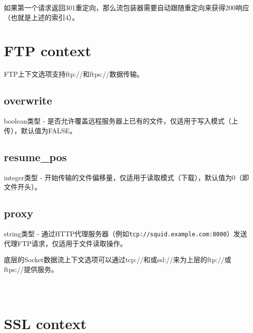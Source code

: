 如果第一个请求返回301重定向，那么流包装器需要自动跟随重定向来获得200响应（也就是上述的索引4）。

\section{FTP context}

FTP上下文选项支持ftp://和ftps://数据传输。

\subsection{overwrite}

boolean类型 - 是否允许覆盖远程服务器上已有的文件，仅适用于写入模式（上传），默认值为FALSE。

\subsection{resume\_pos}

integer类型 - 开始传输的文件偏移量，仅适用于读取模式（下载），默认值为0（即文件开头）。


\subsection{proxy}

string类型 - 通过HTTP代理服务器（例如\texttt{tcp://squid.example.com:8000}）发送代理FTP请求，仅适用于文件读取操作。


底层的Socket数据流上下文选项可以通过tcp://和或ssl://来为上层的ftp://或ftps://提供服务。

\begin{lstlisting}[language=PHP]

\end{lstlisting}



\begin{lstlisting}[language=PHP]

\end{lstlisting}




\begin{lstlisting}[language=PHP]

\end{lstlisting}

\section{SSL context}

